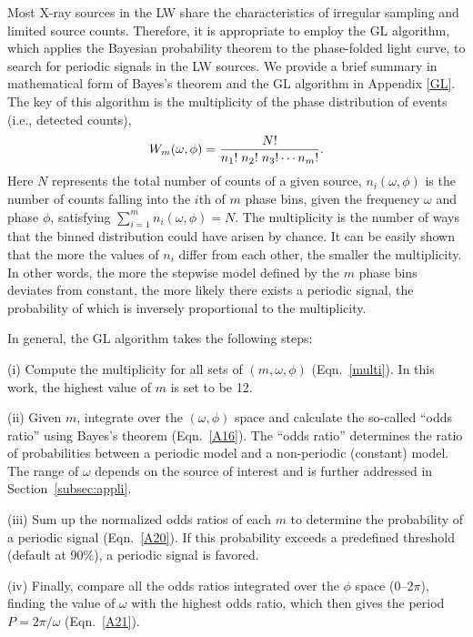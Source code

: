 \documentclass[fleqn,usenatbib]{mnras}
\begin{document}
Most X-ray sources in the LW share the characteristics of irregular sampling and limited source counts. 
Therefore, it is appropriate to employ the GL algorithm, which applies the Bayesian probability theorem to the phase-folded light curve, to search for periodic signals in the LW sources. We provide a brief summary in mathematical form of Bayes's theorem and the GL algorithm in Appendix \ref{GL}. 
The key of this algorithm is the multiplicity of the phase distribution of events (i.e., detected counts),
\begin{equation}\label{multi}
W_m(\omega, \phi)={{N!}\over{n_1!\; n_2!\; n_3!\cdots {n_m}!}}.
\end{equation}
Here $N$ represents the total number of counts of a given source, 
$n_i(\omega, \phi)$ is the number of counts falling into the $i$th of $m$ phase bins, given the frequency $\omega$ and phase $\phi$, satisfying $\sum\limits_{i=1}^{m}n_i(\omega, \phi)=N$. 
The multiplicity is the number of ways that the binned distribution could have arisen by chance. It can be easily shown that the more the values of $n_i$ differ from each other, the smaller the multiplicity. In other words, the more the stepwise model defined by the $m$ phase bins deviates from constant, the more likely there exists a periodic signal, the probability of which is inversely proportional to the multiplicity.  

In general, the GL algorithm takes the following steps:

(i) Compute the multiplicity for all sets of $(m,\omega, \phi)$ (Eqn.~\ref{multi}). In this work, the highest value of $m$ is set to be 12.

(ii) Given $m$, integrate over the $(\omega, \phi)$ space and calculate the so-called ``odds ratio'' using Bayes's theorem (Eqn.~\ref{A16}). The ``odds ratio'' determines the ratio of probabilities between a periodic model and a non-periodic (constant) model. The range of $\omega$ depends on the source of interest and is further addressed in Section~\ref{subsec:appli}.

(iii) Sum up the normalized odds ratios of each $m$ to determine the probability of a periodic signal (Eqn.~\ref{A20}).
If this probability exceeds a predefined threshold (default at 90\%), a periodic signal is favored. 

(iv) Finally, compare all the odds ratios integrated over the $\phi$ space (0--2$\pi$), finding the value of $\omega$ with the highest odds ratio, which then gives the period $P=2{\pi}/\omega$ (Eqn.~\ref{A21}).
\end{document}
